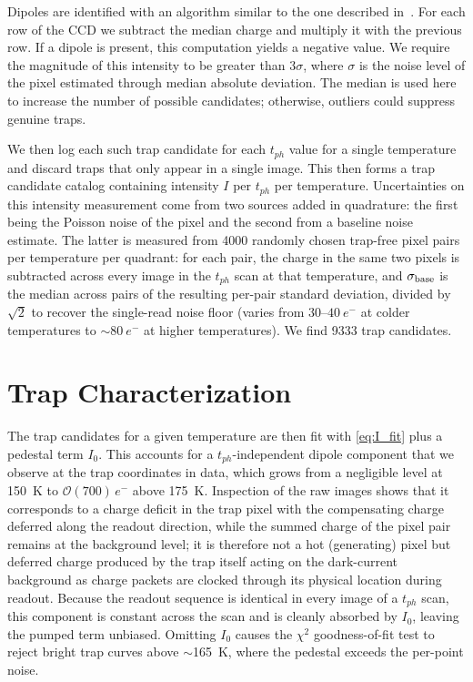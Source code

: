 \documentclass[aps, prapplied,twocolumn,showpacs,superscriptaddress,preprintnumbers, longbibliography,nofootinbib,floatfix]{revtex4-2}
\begin{document}
Dipoles are identified with an algorithm similar to the one described in~\cite{Brusco:2025kus}. 
For each row of the CCD we subtract the median charge and multiply it with the previous row. 
If a dipole is present, this computation yields a negative value. We require the magnitude of this intensity to be greater than $3\sigma$, where $\sigma$ is the noise level of the pixel estimated through median absolute deviation. 
The median is used here to increase the number of possible candidates; otherwise, outliers could suppress genuine traps. 

We then log each such trap candidate for each $t_{ph}$ value for a single temperature and discard traps that only appear in a single image. 
This then forms a trap candidate catalog containing intensity $I$ per $t_{ph}$ per temperature. 
Uncertainties on this intensity measurement come from two sources added in quadrature: the first being the Poisson noise of the pixel and the second from a baseline noise estimate. 
The latter is measured from 4000 randomly chosen trap-free pixel pairs per temperature per quadrant: for each pair, the charge in the same two pixels is subtracted across every image in the $t_{ph}$ scan at that temperature, and $\sigma_{\rm base}$ is the median across pairs of the resulting per-pair standard deviation, divided by $\sqrt{2}$ to recover the single-read noise floor (varies from $30$--$40~ e^-$ at colder temperatures to $\sim80~e^-$ at higher temperatures). 
We find 9333 trap candidates.


\section{Trap Characterization}
\label{sec:characterization}

The trap candidates for a given temperature are then fit with \cref{eq:I_fit} plus a pedestal term $I_0$. 
This accounts for a $t_{ph}$-independent dipole component that we observe at the trap coordinates in data, which grows from a negligible level at 150~K to $\mathcal{O}(700)\,e^-$ above 175~K. 
Inspection of the raw images shows that it corresponds to a charge deficit in the trap pixel with the compensating charge deferred along the readout direction, while the summed charge of the pixel pair remains at the background level; it is therefore not a hot (generating) pixel but deferred charge produced by the trap itself acting on the dark-current background as charge packets are clocked through its physical location during readout. 
Because the readout sequence is identical in every image of a $t_{ph}$ scan, this component is constant across the scan and is cleanly absorbed by $I_0$, leaving the pumped term unbiased. 
Omitting $I_0$ causes the $\chi^2$ goodness-of-fit test to reject bright trap curves above $\sim$165~K, where the pedestal exceeds the per-point noise.
\end{document}
